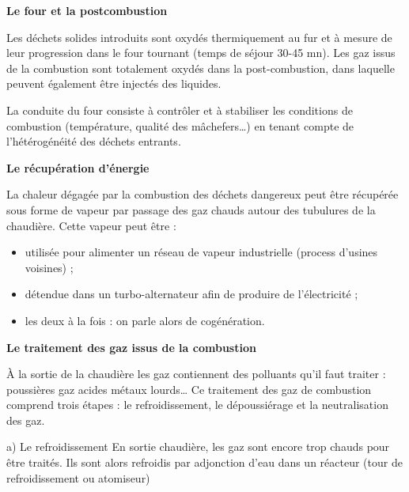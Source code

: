 \vspace{0.3cm}

\textbf{Le four et la postcombustion}
\vspace{0.3cm}

Les déchets solides introduits sont oxydés thermiquement au fur et à mesure de leur progression dans le four tournant (temps de séjour 30-45 mn).
Les gaz issus de la combustion sont totalement oxydés dans la post-combustion, dans laquelle peuvent également être injectés des liquides.
\vspace{0.3 cm}

La conduite du four consiste à contrôler et à stabiliser les conditions de combustion (température, qualité des mâchefers…) en tenant compte de l’hétérogénéité des déchets entrants.


\vspace{0.3cm}

\textbf{Le récupération d'énergie}
\vspace{0.3cm}

La chaleur dégagée par la combustion des déchets dangereux peut être récupérée sous forme de vapeur par passage des gaz chauds autour des tubulures de la chaudière. 
Cette vapeur peut être :

\begin{itemize}
    \item utilisée pour alimenter un réseau de vapeur industrielle (process d’usines voisines) ;
    \item  détendue dans un turbo-alternateur afin de produire de l’électricité ;
    \item les deux à la fois : on parle alors de cogénération.
\end{itemize}

\vspace{0.3cm}

\textbf{Le traitement des gaz issus de la combustion} 
\vspace{0.3 cm}

À la sortie de la chaudière les gaz contiennent des polluants qu’il faut traiter : poussières gaz acides métaux lourds… Ce traitement des gaz de combustion comprend trois étapes : le refroidissement, le dépoussiérage et la neutralisation des gaz.

\vspace{0.3 cm}

a) Le refroidissement
En sortie chaudière, les gaz sont encore trop chauds pour être traités. Ils sont alors refroidis par adjonction d’eau dans un réacteur (tour de refroidissement ou atomiseur)

